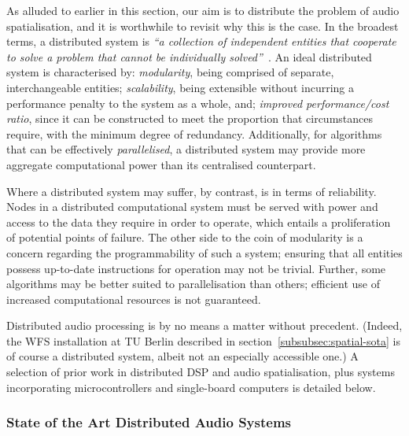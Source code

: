 \documentclass[utf8]{FrontiersinHarvard}
\newcommand{\secref}[1]{section~\ref{#1}}
\begin{document}
    As alluded to earlier in this section, our aim is to distribute the problem
    of audio spatialisation, and it is worthwhile to revisit why this is the
    case.
    In the broadest terms, a distributed system is \textit{``a collection of
    independent entities that cooperate to solve a problem that cannot be
    individually solved''}~\citep{kshemkalyani_distributed_2011}.
    An ideal distributed system is characterised by: \textit{modularity}, being
    comprised of separate, interchangeable entities; \textit{scalability}, being
    extensible without incurring a performance penalty to the system as a whole,
    and; \textit{improved performance/cost ratio}, since it can be constructed
    to meet the proportion that circumstances require, with the minimum degree
    of redundancy.
    Additionally, for algorithms that can be effectively \textit{parallelised},
    a distributed system may provide more aggregate computational power than its
    centralised counterpart.

    Where a distributed system may suffer, by contrast, is in terms of
    reliability.
    Nodes in a distributed computational system must be served with power and
    access to the data they require in order to operate, which entails a
    proliferation of potential points of failure.
    The other side to the coin of modularity is a concern regarding the
    programmability of such a system;
    ensuring that all entities possess up-to-date instructions for operation may
    not be trivial.
    Further, some algorithms may be better suited to parallelisation than
    others; efficient use of increased computational resources is not
    guaranteed.

    Distributed audio processing is by no means a matter without precedent.
    (Indeed, the WFS installation at TU Berlin described in
    \secref{subsubsec:spatial-sota} is of course a distributed system, albeit
    not an especially accessible one.)
    A selection of prior work in distributed DSP and audio spatialisation, plus
    systems incorporating microcontrollers and single-board computers is
    detailed below.

    \subsubsection{State of the Art Distributed Audio Systems}
\end{document}
